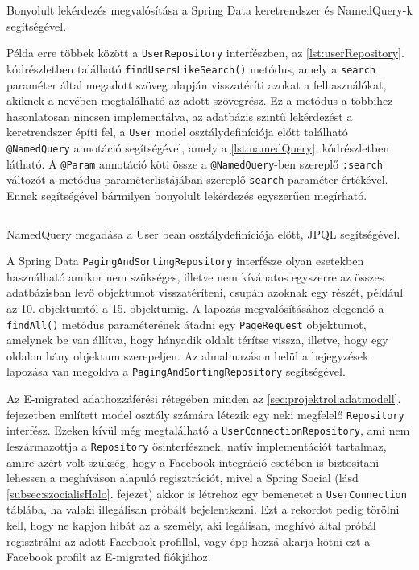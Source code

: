 \begin{listing}
  \inputminted{java}{progfiles/UserRepository.java}
  \caption{Bonyolult lekérdezés megvalósítása a Spring Data keretrendszer és NamedQuery-k segítségével.}
  \label{lst:userRepository}
\end{listing}


Példa erre többek között a \texttt{UserRepository} interfészben, az \ref{lst:userRepository}. kódrészletben található \texttt{findUsersLikeSearch()} metódus, amely a \texttt{search} paraméter által megadott szöveg alapján visszatéríti azokat a felhasználókat, akiknek a nevében megtalálható az adott szövegrész. Ez a metódus a többihez hasonlatosan nincsen implementálva, az adatbázis szintű lekérdezést a keretrendszer építi fel, a \texttt{User} model osztálydefiníciója előtt található \texttt{@NamedQuery} annotáció segítségével, amely a \ref{lst:namedQuery}. kódrészletben látható. A \texttt{@Param} annotáció köti össze a \texttt{@NamedQuery}-ben szereplő \texttt{:search} változót a metódus paraméterlistájában szereplő \texttt{search} paraméter értékével. Ennek segítségével bármilyen bonyolult lekérdezés egyszerűen megírható. 

\begin{listing}
  \inputminted[fontsize=\small]{java}{progfiles/UserNamedQuery.java}
  \caption{NamedQuery megadása a User bean osztálydefiníciója előtt, JPQL segítségével.}
  \label{lst:namedQuery}
\end{listing}

A Spring Data \texttt{PagingAndSortingRepository} interfésze olyan esetekben használható amikor nem szükséges, illetve nem kívánatos egyszerre az összes adatbázisban levő objektumot visszatéríteni, csupán azoknak egy részét, például az 10. objektumtól a 15. objektumig. A lapozás megvalósításához elegendő a \texttt{findAll()} metódus paraméterének átadni egy \texttt{PageRequest} objektumot, amelynek be van állítva, hogy hányadik oldalt térítse vissza, illetve, hogy egy oldalon hány objektum szerepeljen. Az almalmazáson belül a bejegyzések lapozása van megoldva a \texttt{PagingAndSortingRepository} segítségével.

Az E-migrated adathozzáférési rétegében minden az  \ref{sec:projektrol:adatmodell}. fejezetben említett model osztály  számára létezik egy neki megfelelő \texttt{Repository} interfész. Ezeken kívül még megtalálható a \texttt{UserConnectionRepository}, ami nem leszármazottja a \texttt{Repository} ősinterfésznek, natív implementációt tartalmaz, amire azért volt szükség, hogy a Facebook integráció esetében is biztosítani lehessen a meghíváson alapuló regisztrációt, mivel a Spring Social (lásd \ref{subsec:szocialisHalo}. fejezet) akkor is létrehoz egy bemenetet a \texttt{UserConnection} táblába, ha valaki illegálisan próbált bejelentkezni. Ezt a rekordot pedig törölni kell, hogy ne kapjon hibát az a személy, aki legálisan, meghívó által próbál regisztrálni az adott Facebook profillal, vagy épp hozzá akarja kötni ezt a Facebook profilt az E-migrated fiókjához.

